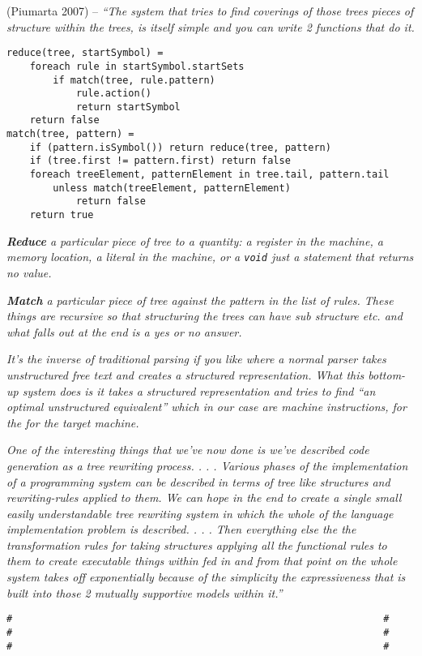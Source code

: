 (Piumarta 2007) -- \emph{``The system that tries to find coverings of
those trees pieces of structure within the trees, is itself simple and
you can write 2 functions that do it.}

\begin{verbatim}
reduce(tree, startSymbol) =
    foreach rule in startSymbol.startSets
        if match(tree, rule.pattern)
            rule.action()
            return startSymbol
    return false
match(tree, pattern) =
    if (pattern.isSymbol()) return reduce(tree, pattern)
    if (tree.first != pattern.first) return false
    foreach treeElement, patternElement in tree.tail, pattern.tail
        unless match(treeElement, patternElement)
            return false
    return true
\end{verbatim}

\emph{\textbf{Reduce} a particular piece of tree to a quantity: a
register in the machine, a memory location, a literal in the machine, or
a \texttt{void} just a statement that returns no value.}

\emph{\textbf{Match} a particular piece of tree against the pattern in
the list of rules. These things are recursive so that structuring the
trees can have sub structure etc. and what falls out at the end is a yes
or no answer.}

\emph{It's the inverse of traditional parsing if you like where a normal
parser takes unstructured free text and creates a structured
representation. What this bottom-up system does is it takes a structured
representation and tries to find ``an optimal unstructured equivalent''
which in our case are machine instructions, for the for the target
machine.}

\emph{One of the interesting things that we've now done is we've
described code generation as a tree rewriting process. . . . Various
phases of the implementation of a programming system can be described in
terms of tree like structures and rewriting-rules applied to them. We
can hope in the end to create a single small easily understandable tree
rewriting system in which the whole of the language implementation
problem is described. . . . Then everything else the the transformation
rules for taking structures applying all the functional rules to them to
create executable things within fed in and from that point on the whole
system takes off exponentially because of the simplicity the
expressiveness that is built into those 2 mutually supportive models
within it.''}

\begin{verbatim}
#                                                                #
#                                                                #
#                                                                #
\end{verbatim}

